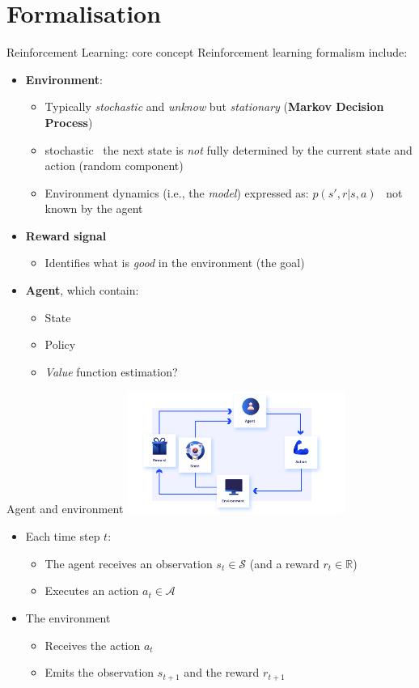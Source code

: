 \documentclass[presentation, 9pt]{beamer}\mode<presentation>{\usetheme{AMSBolognaFC}}
\begin{document}
\section{Formalisation}
\begin{frame}{Reinforcement Learning: core concept}
Reinforcement learning formalism include:
\begin{itemize}
	\item \textbf{Environment}:
	\begin{itemize}
		\item Typically \emph{stochastic} and \emph{unknow} but \emph{stationary} (\textbf{Markov Decision Process})
		\item stochastic \faArrowRight \, the next state is \emph{not} fully determined by the current state and action (random component)
		\item Environment dynamics (i.e., the \emph{model}) expressed as: $p(s', r | s, a)$ \faArrowRight \, not known by the agent
	\end{itemize}
	\item \textbf{Reward signal} 
	\begin{itemize}
		\item Identifies what is \emph{good} in the environment (the goal)
	\end{itemize}
	\item \textbf{Agent}, which contain:
	\begin{itemize}	
		\item State
		\item Policy
		\item \emph{Value} function estimation?
	\end{itemize}
\end{itemize}
\end{frame}
\begin{frame}{Agent and environment}
\centering
\includegraphics[height=4cm]{img/interaction-loop.png}
\begin{itemize}
	\item Each time step $t$:
	\begin{itemize}
		\item The agent receives an observation $s_t \in \mathcal{S}$ (and a reward $r_t \in \mathbb{R}$)
		\item Executes an action $a_t \in \mathcal{A}$
	\end{itemize}
	\item The environment 
	\begin{itemize}
		\item Receives the action $a_t$
		\item Emits the observation $s_{t+1}$ and the reward $r_{t+1}$
	\end{itemize}
\end{itemize}
\end{frame}
\end{document}

